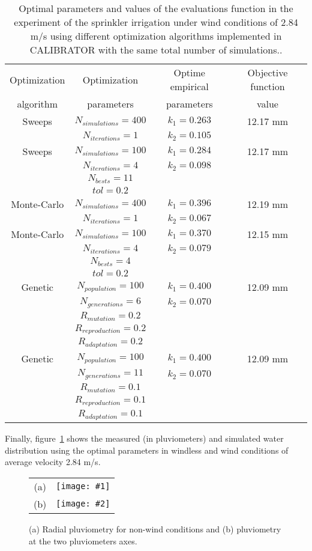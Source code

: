 \documentclass[review,authoryear]{elsarticle}
\newcommand{\TABLE}[5]
{
	\begin{table}[ht!]
		\centering
		\caption{#4.\label{#5}}
		#1
		\begin{tabular}{#2}
			#3
		\end{tabular}
	\end{table}
}
\newcommand{\FIGII}[4]
{
	\begin{figure}[ht!]
		\centering
		\begin{tabular}{cc}
			(a) & \texttt{[image: \#1]} \\
			(b) & \texttt{[image: \#2]}
		\end{tabular}
		\caption{#3.\label{#4}}
	\end{figure}
}
\begin{document}
\TABLE{\scriptsize}{cccc}
{
	Optimization & Optimization & Optime empirical & Objective function
	\\ algorithm & parameters & parameters & value
	\\ \hline
	Sweeps & $N_{simulations}=400$ & $k_1=0.263$ & 12.17 mm
	\\ & $N_{iterations}=1$ & $k_2=0.105$
	\\ \hline
	Sweeps & $N_{simulations}=100$ & $k_1=0.284$ & 12.17 mm
	\\ & $N_{iterations}=4$ & $k_2=0.098$
	\\ & $N_{bests}=11$
	\\ & $tol=0.2$
	\\ \hline
	Monte-Carlo & $N_{simulations}=400$ & $k_1=0.396$ & 12.19 mm
	\\ & $N_{iterations}=1$ & $k_2=0.067$
	\\ \hline
	Monte-Carlo & $N_{simulations}=100$ & $k_1=0.370$ & 12.15 mm
	\\ & $N_{iterations}=4$ & $k_2=0.079$
	\\ & $N_{bests}=4$
	\\ & $tol=0.2$
	\\ \hline
	Genetic & $N_{population}=100$ & $k_1=0.400$ & 12.09 mm
	\\ & $N_{generations}=6$ & $k_2=0.070$
	\\ & $R_{mutation}=0.2$
	\\ & $R_{reproduction}=0.2$
	\\ & $R_{adaptation}=0.2$
	\\ \hline
	Genetic & $N_{population}=100$ & $k_1=0.400$ & 12.09 mm
	\\ & $N_{generations}=11$ & $k_2=0.070$
	\\ & $R_{mutation}=0.1$
	\\ & $R_{reproduction}=0.1$
	\\ & $R_{adaptation}=0.1$
	\\ \hline
}{Optimal parameters and values of the evaluations function in the experiment of the sprinkler irrigation under wind conditions of 2.84 m/s using different optimization algorithms implemented in CALIBRATOR with the same total number of simulations.}{TabSprinklerII}

Finally, figure~\ref{FigSprinkler} shows the measured (in pluviometers) and simulated water distribution using the optimal parameters in windless and wind conditions of average velocity 2.84 m/s.

\FIGII{sprinkler-0.eps}{sprinkler-2,84.eps}
{(a) Radial pluviometry for non-wind conditions and (b) pluviometry at the two
pluviometers axes}{FigSprinkler}
\end{document}
